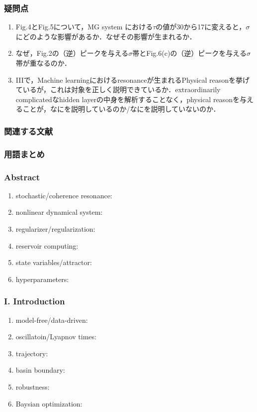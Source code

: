 \subsubsection{疑問点}
\begin{enumerate}
  \item Fig.4とFig.5について，MG system における$\tau$の値が30から17に変えると，$\sigma$にどのような影響があるか．なぜその影響が生まれるか．
  \item なぜ，Fig.2の（逆）ピークを与える$\sigma$帯とFig.6(c)の（逆）ピークを与える$\sigma$帯が重なるのか．
  \item IIIで，Machine learningにおけるresonanceが生まれるPhysical reasonを挙げているが，これは対象を正しく説明できているか．extraordinarily complicatedなhidden layerの中身を解析することなく，physical reasonを与えることが，なにを説明しているのか/なにを説明していないのか．
\end{enumerate}

\subsubsection{関連する文献}
 
\clearpage
\subsubsection{用語まとめ}

\subsubsection{Abstract}
\begin{enumerate}
  \item stochastic/coherence resonance: 
  \item nonlinear dynamical system:
  \item regularizer/regularization:
  \item reservoir computing:
  \item state variables/attractor:
  \item hyperparameters:
\end{enumerate}
\subsubsection{I. Introduction}
\begin{enumerate}
  \item model-free/data-driven:
  \item oscillatoin/Lyapnov times:
  \item trajectory:
  \item basin boundary: 
  \item robustness:
  \item Baysian optimization:
\end{enumerate}

